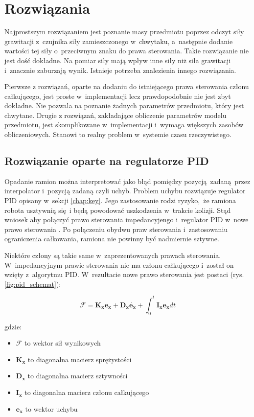 \section{Rozwiązania}

Najprostszym rozwiązaniem jest poznanie masy przedmiotu poprzez odczyt siły grawitacji z~czujnika siły zamieszczonego w~chwytaku, a~następnie dodanie wartości tej siły o~przeciwnym znaku do prawa sterowania. Takie rozwiązanie nie jest dość dokładne. Na pomiar siły mają wpływ inne siły niż siła grawitacji i~znacznie zaburzają wynik. Istnieje potrzeba znalezienia innego rozwiązania.

Pierwsze z rozwiązań, oparte na dodaniu do istniejącego prawa sterowania członu całkującego, jest proste w~implementacji lecz prawdopodobnie nie jest zbyt dokładne. Nie pozwala na poznanie żadnych parametrów przedmiotu, który jest chwytane. Drugie z rozwiązań, zakładające obliczenie parametrów modelu przedmiotu, jest skomplikowane w~implementacji i~wymaga większych zasobów obliczeniowych. Stanowi to realny problem w~systemie czasu rzeczywistego. 

\subsection{Rozwiązanie oparte na regulatorze PID}
\label{chap:rozw_pid}
Opadanie ramion można interpretować jako błąd pomiędzy pozycją zadaną przez interpolator i~pozycją zadaną czyli uchyb. Problem uchybu rozwiązuje regulator PID opisany w~sekcji \ref{chap:key}. Jego zastosowanie rodzi ryzyko, że ramiona robota usztywnią się i będą powodować uszkodzenia w~trakcie kolizji. Stąd wniosek aby połączyć prawo sterowania impedancyjengo i~regulator PID w~nowe prawo sterowania \cite{bib:gravity2, bib:rozw_pid1}. Po połączeniu obydwu praw sterowania i~zastosowaniu ograniczenia całkowania, ramiona nie powinny być nadmiernie sztywne. 

Niektóre człony są takie same w~zaprezentowanych prawach sterowania. W~impedancyjnym prawie sterowania nie ma członu całkującego i~został on wzięty z~algorytmu PID. W~rezultacie nowe prawo sterowania jest postaci (rys. \ref{fig:pid_schemat}):

\begin{equation}
\label{eq:prawo_ster}
\boldsymbol{\mathcal{F}} = \boldsymbol{K_x}\boldsymbol{e_x} + \boldsymbol{D_x}\dot{\boldsymbol{e_x}} + \int_{0}^{t}  \boldsymbol{I_x}\boldsymbol{e_x}dt
\end{equation}

gdzie:
\begin{itemize}
	\item $\boldsymbol{\mathcal{F}}$ to wektor sił wynikowych
	\item $\boldsymbol{K_x}$ to diagonalna macierz sprężystości
	\item $\boldsymbol{D_x}$ to diagonalna macierz sztywności
	\item $\boldsymbol{I_x}$ to diagonalna macierz członu całkującego
	\item $\boldsymbol{e_x}$ to wektor uchybu
\end{itemize}

